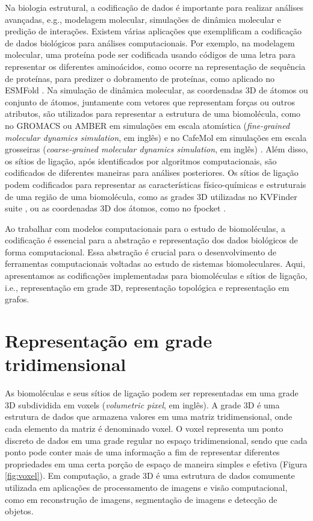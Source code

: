 \documentclass[Portugues]{phdquali}
\def\ie{i.e.\onedot}
\def\eg{e.g.\onedot}
\begin{document}
Na biologia estrutural, a codificação de dados é importante para realizar análises avançadas, \eg, modelagem molecular, simulações de dinâmica molecular e predição de interações. Existem várias aplicações que exemplificam a codificação de dados biológicos para análises computacionais. Por exemplo, na modelagem molecular, uma proteína pode ser codificada usando códigos de uma letra para representar os diferentes aminoácidos, como ocorre na representação de sequência de proteínas, para predizer o dobramento de proteínas, como aplicado no ESMFold \cite{lin2022}. Na simulação de dinâmica molecular, as coordenadas 3D de átomos ou conjunto de átomos, juntamente com vetores que representam forças ou outros atributos, são utilizados para representar a estrutura de uma biomolécula, como no GROMACS \cite{gromacs} ou AMBER \cite{amber} em simulações em escala atomística (\textit{fine-grained molecular dynamics simulation}, em inglês) e no CafeMol em simulações em escala grosseiras (\textit{coarse-grained molecular dynamics simulation}, em inglês) \cite{kenzaki2011}. Além disso, os sítios de ligação, após identificados por algoritmos computacionais, são codificados de diferentes maneiras para análises posteriores. Os sítios de ligação podem codificados para representar as características físico-químicas e estruturais de uma região de uma biomolécula, como as grades 3D utilizadas no KVFinder suite \cite{oliveira2014,guerra2020,guerra2021,guerra2023B}, ou as coordenadas 3D dos átomos, como no fpocket \cite{fpocket}.

Ao trabalhar com modelos computacionais para o estudo de biomoléculas, a codificação é essencial para a abstração e representação dos dados biológicos de forma computacional. Essa abstração é crucial para o desenvolvimento de ferramentas computacionais voltadas ao estudo de sistemas biomoleculares. Aqui, apresentamos as codificações implementadas para biomoléculas e sítios de ligação, \ie, representação em grade 3D, representação topológica e representação em grafos.

\section{Representação em grade tridimensional}

As biomoléculas e seus sítios de ligação podem ser representadas em uma grade 3D subdividida em voxels (\textit{volumetric pixel}, em inglês). A grade 3D é uma estrutura de dados que armazena valores em uma matriz tridimensional, onde cada elemento da matriz é denominado voxel. O voxel representa um ponto discreto de dados em uma grade regular no espaço tridimensional, sendo que cada ponto pode conter mais de uma informação a fim de representar diferentes propriedades em uma certa porção de espaço de maneira simples e efetiva (Figura \ref{fig:voxel}). Em computação, a grade 3D é uma estrutura de dados comumente utilizada em aplicações de processamento de imagens e visão computacional, como em reconstrução de imagens, segmentação de imagens e detecção de objetos. 
\end{document}
